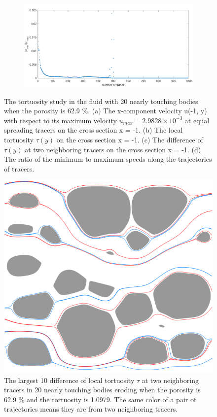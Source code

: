 \documentclass[preprint, 10pt]{elsarticle}
\begin{document}
\begin{figure}[H]
\begin{subfigure}[b]{0.5\textwidth}
\includegraphics*[width =\linewidth]{./figs/uminDumax20_268}
\caption{}
\end{subfigure}
\caption{\label{fig:Eroding20tort} The tortuosity study in the fluid with 
20 nearly touching bodies when the porosity is 62.9 \%.
(a) The 
x-component velocity u(-1, y) with respect to its maximum velocity $u_{max}=2.9828
\times 10^{-3}$ at equal spreading tracers on the cross section x = -1. 
(b) The local tortuosity $\tau(y)$ on the cross section x = -1. 
(c) The difference of $\tau(y)$ at two neighboring tracers on the cross section x = -1.
(d) The ratio of the minimum to maximum speeds along the trajectories of tracers.}
\end{figure}

\begin{figure}[H]
\center
\includegraphics*[width =0.5\linewidth]{./figs/tort_diff_top10_268}
\caption{\label{fig:Eroding20tort_traj} The largest 10 difference of 
local tortuosity $\tau$ at two neighboring tracers in
 20 nearly touching bodies eroding when the porosity is 62.9 \% 
and the tortuosity is 1.0979. The same color of a pair of trajectories 
means they are from two neighboring tracers.}
\end{figure}
\end{document}
